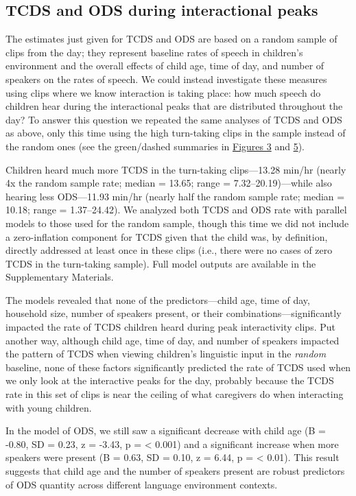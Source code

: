 \documentclass[floatsintext,man]{apa6}
\theoremstyle{definition}
\theoremstyle{definition}
\theoremstyle{definition}
\theoremstyle{remark}
\begin{document}
\subsection{TCDS and ODS during interactional
peaks}\label{tcds-and-ods-during-interactional-peaks}

The estimates just given for TCDS and ODS are based on a random sample
of clips from the day; they represent baseline rates of speech in
children's environment and the overall effects of child age, time of
day, and number of speakers on the rates of speech. We could instead
investigate these measures using clips where we know interaction is
taking place: how much speech do children hear during the interactional
peaks that are distributed throughout the day? To answer this question
we repeated the same analyses of TCDS and ODS as above, only this time
using the high turn-taking clips in the sample instead of the random
ones (see the green/dashed summaries in \protect\hyperlink{fig3}{Figures
3} and \protect\hyperlink{fig5}{5}).

Children heard much more TCDS in the turn-taking clips---13.28 min/hr
(nearly 4x the random sample rate; median = 13.65; range =
7.32--20.19)---while also hearing less ODS---11.93 min/hr (nearly half
the random sample rate; median = 10.18; range = 1.37--24.42). We
analyzed both TCDS and ODS rate with parallel models to those used for
the random sample, though this time we did not include a zero-inflation
component for TCDS given that the child was, by definition, directly
addressed at least once in these clips (i.e., there were no cases of
zero TCDS in the turn-taking sample). Full model outputs are available
in the Supplementary Materials.

The models revealed that none of the predictors---child age, time of
day, household size, number of speakers present, or their
combinations---significantly impacted the rate of TCDS children heard
during peak interactivity clips. Put another way, although child age,
time of day, and number of speakers impacted the pattern of TCDS when
viewing children's linguistic input in the \emph{random} baseline, none
of these factors significantly predicted the rate of TCDS used when we
only look at the interactive peaks for the day, probably because the
TCDS rate in this set of clips is near the ceiling of what caregivers do
when interacting with young children.

In the model of ODS, we still saw a significant decrease with child age
(B = -0.80, SD = 0.23, z = -3.43, p = \textless{} 0.001) and a
significant increase when more speakers were present (B = 0.63, SD =
0.10, z = 6.44, p = \textless{} 0.01). This result suggests that child
age and the number of speakers present are robust predictors of ODS
quantity across different language environment contexts.
\end{document}
